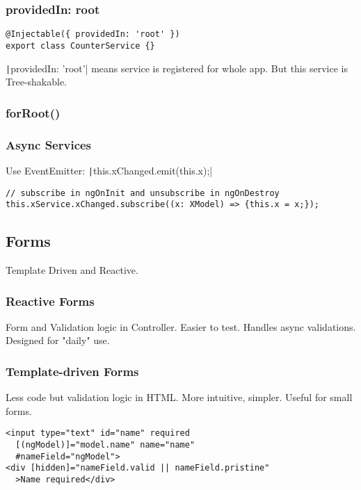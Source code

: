 \begin{multicols*}{4}
\subsubsection{providedIn: root}
\begin{verbatim}
@Injectable({ providedIn: 'root' })
export class CounterService {}
\end{verbatim}
\texttt|{providedIn: 'root'}| means service is registered for whole app. But this service is Tree-shakable.

\subsubsection{forRoot()}

\subsubsection{Async Services}
Use EventEmitter: \texttt|this.xChanged.emit(this.x);|
\begin{verbatim}
// subscribe in ngOnInit and unsubscribe in ngOnDestroy
this.xService.xChanged.subscribe((x: XModel) => {this.x = x;});
\end{verbatim}

\subsection{Forms}
Template Driven and Reactive.

\subsubsection{Reactive Forms}
Form and Validation logic in Controller. Easier to test. Handles async validations. Designed for "daily" use.

\subsubsection{Template-driven Forms}
Less code but validation logic in HTML. More intuitive, simpler. Useful for small forms.

\begin{verbatim}
<input type="text" id="name" required
  [(ngModel)]="model.name" name="name"
  #nameField="ngModel">
<div [hidden]="nameField.valid || nameField.pristine"
  >Name required</div>


\end{verbatim}
\end{multicols*}
